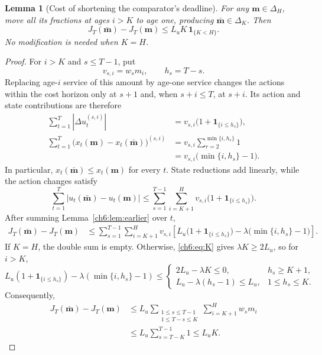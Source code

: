 \documentclass[11pt]{article}
\newcommand{\ind}[1]{\mathbf{1}_{\{#1\}}}
\theoremstyle{plain}
\newtheorem{Thm:Lemma}[Thm:Theorem]{Lemma}
\theoremstyle{remark}
\numberwithin{equation}{section}
\begin{document}
\begin{Thm:Lemma}[Cost of shortening the comparator's deadline]\label{ch6:lem:reduce}
For any $\mathbf m\in\Delta_{H}$, move all its fractions at ages $i>K$ to age one,
producing $\bar{\mathbf m}\in\Delta_K$. Then
\begin{equation}\label{ch6:eq:reduce}
 J_T(\bar{\mathbf m})-J_T(\mathbf m)\le L_uK\,\ind{K<H}.
\end{equation}
No modification is needed when $K=H$.
\end{Thm:Lemma}
\begin{proof}
For $i>K$ and $s\le T-1$, put
\[
v_{s,i}=w_sm_i,\qquad h_s=T-s.
\]
Replacing age-$i$ service of this amount by age-one service changes the
actions within the cost horizon only at $s+1$ and, when $s+i\le T$, at $s+i$.
Its action and state contributions are therefore
\begin{align*}
\sum_{t=1}^{T}|\Delta u_t^{(s,i)}|
&=v_{s,i}\bigl(1+\ind{i\le h_s}\bigr),\\
\sum_{t=1}^{T}\bigl(x_t(\mathbf m)-x_t(\bar{\mathbf m})\bigr)^{(s,i)}
&=v_{s,i}\sum_{r=2}^{\min\{i,h_s\}}1\\
&=v_{s,i}\bigl(\min\{i,h_s\}-1\bigr).
\end{align*}
In particular, $x_t(\bar{\mathbf m})\le x_t(\mathbf m)$ for every $t$.
State reductions add linearly, while the action changes satisfy
\[
\sum_{t=1}^{T}|u_t(\bar{\mathbf m})-u_t(\mathbf m)|
\le\sum_{s=1}^{T-1}\sum_{i=K+1}^{H}
v_{s,i}\bigl(1+\ind{i\le h_s}\bigr).
\]
After summing Lemma~\ref{ch6:lem:earlier} over $t$,
\begin{align}
J_T(\bar{\mathbf m})-J_T(\mathbf m)
&\le\sum_{s=1}^{T-1}\sum_{i=K+1}^{H}v_{s,i}
\left[
L_u\bigl(1+\ind{i\le h_s}\bigr)
-\lambda\bigl(\min\{i,h_s\}-1\bigr)
\right].
\label{ch6:eq:moved-net}
\end{align}
If $K=H$, the double sum is empty.  Otherwise,
\eqref{ch6:eq:K} gives $\lambda K\ge2L_u$, so for $i>K$,
\[
L_u(1+\ind{i\le h_s})-\lambda(\min\{i,h_s\}-1)
\le
\begin{cases}
2L_u-\lambda K\le0, & h_s\ge K+1,\\
L_u-\lambda(h_s-1)\le L_u, & 1\le h_s\le K.
\end{cases}
\]
Consequently,
\begin{align*}
J_T(\bar{\mathbf m})-J_T(\mathbf m)
&\le L_u\sum_{\substack{1\le s\le T-1\\1\le T-s\le K}}
\sum_{i=K+1}^{H}w_sm_i\\
&\le L_u\sum_{s=T-K}^{T-1}1
\le L_uK.
\end{align*}
\end{proof}
\end{document}
